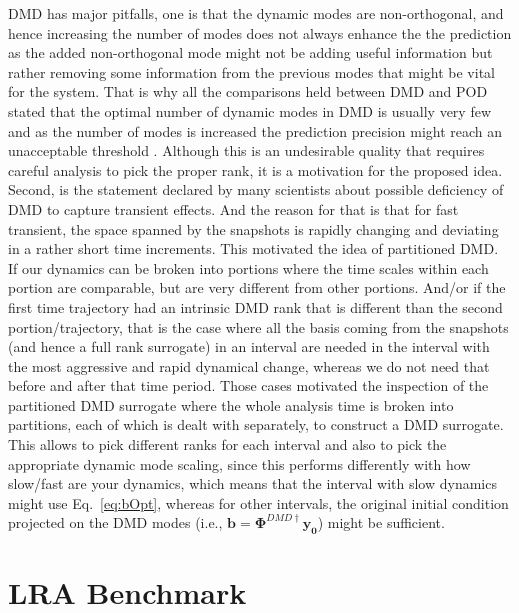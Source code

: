 \documentclass{anstrans}
\renewcommand{\vec}[1]{\bm{#1}} %
\begin{document}
DMD has major pitfalls, one is that the dynamic modes are non-orthogonal, and hence increasing the number of modes does not always enhance the the prediction as the added non-orthogonal mode might not be adding useful information but rather removing some information from the previous modes that might be vital for the system. That is why all the comparisons held between DMD and POD stated that the optimal number of dynamic modes in DMD is usually very few and as the number of modes is increased the prediction precision might reach an unacceptable threshold \cite{DMDvsPOD}. Although this is an undesirable quality that requires careful analysis to pick the proper rank, it is a motivation for the proposed idea. Second, is the statement declared by many scientists about possible deficiency of DMD to capture transient effects. And the reason for that is that for fast transient, the space spanned by the snapshots is rapidly changing and deviating in a rather short time increments. This motivated the idea of partitioned DMD. If our dynamics can be broken into portions where the time scales within each portion are comparable, but are very different from other portions. And/or if the first time trajectory had an intrinsic DMD rank that is different than the second portion/trajectory, that is the case where all the basis coming from the snapshots (and hence a full rank surrogate) in an interval are needed in the interval with the most aggressive and rapid dynamical change, whereas we do not need that before and after that time period. Those cases motivated the inspection of the partitioned DMD surrogate where the whole analysis time is broken into partitions, each of which is dealt with separately, to construct a DMD surrogate. This allows to pick different ranks for each interval and also to pick the appropriate dynamic mode scaling, since this performs differently with how slow/fast are your dynamics, which means that the interval with slow dynamics might use Eq.~\ref{eq:bOpt}, whereas for other intervals, the original initial condition projected on the DMD modes (i.e., $\vec{b}={\boldsymbol{\Phi}^{DMD\dagger}} \vec{y_0}$) might be sufficient.


\section{LRA Benchmark}
\label{sec:application}

\end{document}
